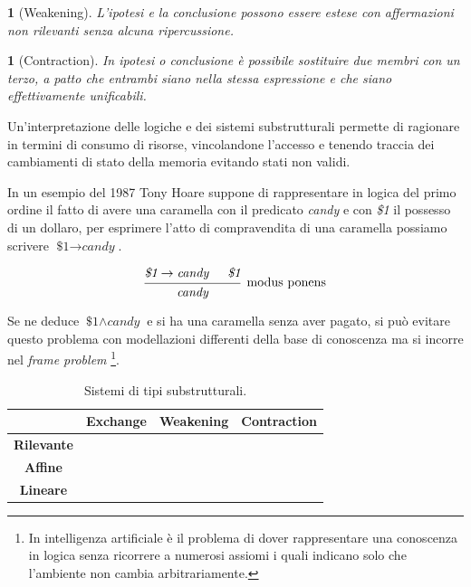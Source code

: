 \documentclass[Lau,binding=0.6cm]{sapthesis}
\newtheorem{lemma}[theorem]{}
\newcommand{\cmark}{\ding{51}}
\newcommand{\xmark}{\ding{55}}
\begin{document}
\begin{lemma}[Weakening] \label{lemma:weakening}
    L'ipotesi e la conclusione possono essere estese con affermazioni non rilevanti senza alcuna ripercussione. 
\end{lemma}

\begin{lemma}[Contraction] \label{lemma:contraction}
    In ipotesi o conclusione è possibile sostituire due membri con un terzo, a patto che entrambi siano nella stessa espressione e che siano effettivamente unificabili.
\end{lemma}

Un'interpretazione delle logiche e dei sistemi substrutturali permette di ragionare in termini di consumo di risorse, vincolandone l'accesso e tenendo traccia dei cambiamenti di stato della memoria evitando stati non validi. 

In un esempio del 1987 Tony Hoare suppone di rappresentare in logica del primo ordine il fatto di avere una caramella con il predicato \textit{candy} e con  \textit{\$1} il possesso di un dollaro, per esprimere l'atto di compravendita di una caramella possiamo scrivere $ \textit{\$1} \rightarrow \textit{candy} $.

\begin{equation*}
  \begin{prooftree}
    \hypo{\textit{\$1} \rightarrow \textit{candy}}
    \hypo{\textit{\$1}}
    \infer2[modus ponens]{\textit{candy}}
  \end{prooftree}
\end{equation*}

Se ne deduce $ \textit{\$1} \land \textit{candy} $ e si ha una caramella senza aver pagato, si può evitare questo problema con modellazioni differenti della base di conoscenza ma si incorre nel \textit{frame problem} \footnote{In intelligenza artificiale è il problema di dover rappresentare una conoscenza in logica senza ricorrere a numerosi assiomi i quali indicano solo che l'ambiente non cambia arbitrariamente.}. 

\begin{table}[h!t]
    \centering
    \caption{Sistemi di tipi substrutturali.}
    \label{tab:substructural_type_systems}
    \begin{tabular}{c|ccc}
        & \textbf{Exchange} & \textbf{Weakening} & \textbf{Contraction} \\
        \hline
        \textbf{Rilevante} & \cmark & \xmark & \cmark\\
        \textbf{Affine} & \cmark & \cmark & \xmark\\
        \textbf{Lineare} & \cmark & \xmark & \xmark\\
    \end{tabular}
\end{table}
\end{document}
